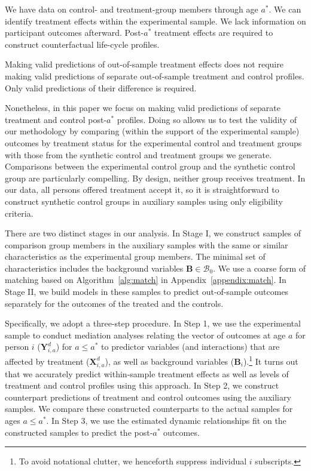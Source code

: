 We have data on control- and treatment-group members through age $a^{\ast}$. We can identify treatment effects within the experimental sample. We lack information on participant outcomes afterward. Post-$a^{\ast}$ treatment effects are required to construct counterfactual life-cycle profiles.

Making valid predictions of out-of-sample treatment effects does not require making valid predictions of separate out-of-sample treatment and control profiles. Only valid predictions of their difference is required.

Nonetheless, in this paper we focus on making valid predictions of separate treatment and control post-$a^*$ profiles. Doing so allows us to test the validity of our methodology by comparing (within the support of the experimental sample) outcomes by treatment status for the experimental control and treatment groups with those from the synthetic control and treatment groups we generate. Comparisons between the experimental control group and the synthetic control group are particularly compelling. By design, neither group receives treatment. In our data, all persons offered treatment accept it, so it is straightforward to construct synthetic control groups in auxiliary samples using only eligibility criteria.

There are two distinct stages in our analysis. In Stage I, we construct samples of comparison group members in the auxiliary samples with the same or similar characteristics as the experimental group members. The minimal set of characteristics includes the background variables $\bm{B} \in \mathcal{B}_0$. We use a coarse form of matching based on Algorithm~\ref{alg:match} in  Appendix~\ref{appendix:match}. In Stage II, we build models in these samples to predict out-of-sample outcomes separately for the outcomes of the treated and the controls.

Specifically, we adopt a three-step procedure. In Step 1, we use the experimental sample to conduct mediation analyses relating the vector of outcomes at age $a$ for person $i$ ($\bm{Y}^{d}_{i,a}$) for $a\leq a^*$ to predictor variables (and interactions) that are affected by treatment ($\bm{X}^{d}_{i,a}$), as well as background variables ($\bm{B}_i$).\footnote{To avoid notational clutter, we henceforth suppress individual $i$ subscripts.} It turns out that we accurately predict within-sample treatment effects as well as levels of treatment and control profiles using this approach. In Step 2, we construct counterpart predictions of treatment and control outcomes using the auxiliary samples. We compare these constructed counterparts to the actual samples for ages $a \leq a^\ast$. In Step 3, we use the estimated dynamic relationships fit on the constructed samples to predict the post-$a^{\ast}$ outcomes.

